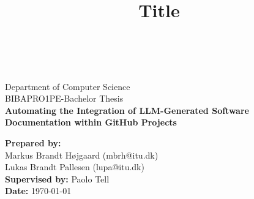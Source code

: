 \documentclass[12pt]{article}
\title{Title}
\makeatletter
\def \LOGOPATH {Figures/ITU.svg}
\def \DEPARTEMENT {Department of Computer Science}
\def \COURSENUM {BIBAPRO1PE}
\def \COURSENAME {Bachelor Thesis}
\def \REPORTTITLE {Automating the Integration of LLM-Generated Software Documentation within GitHub Projects}
\def \STUDENTNAMEI {Markus Brandt Højgaard (mbrh@itu.dk)}
\def \STUDENTNAMEII {Lukas Brandt Pallesen (lupa@itu.dk)}
\def \INSTRUCTOR {Paolo Tell}
\makeatother
\begin{document}

\begin{titlepage}
    \vfill
    \begin{center}
         \\
        \hfill \\
        \Large{\DEPARTEMENT} \\
        \Large{\COURSENUM\;-\;\COURSENAME} \\
        \vfill
        \textbf{\LARGE{\REPORTTITLE}}
    \end{center}
    \vfill
    \begin{flushleft}
        \Large{\textbf{Prepared by:}} \\
        \Large{\STUDENTNAMEI} \\
        \Large{\STUDENTNAMEII} \\
        \Large{\textbf{Supervised by:} \INSTRUCTOR} \\
        \Large{\textbf{Date:} \today}
    \end{flushleft}
    \vfill
\end{titlepage}







\newpage

\tableofcontents

\newpage












\label{EndOfText}

\newpage
{}



\newpage

\label{endOfDoc}






\end{document}
